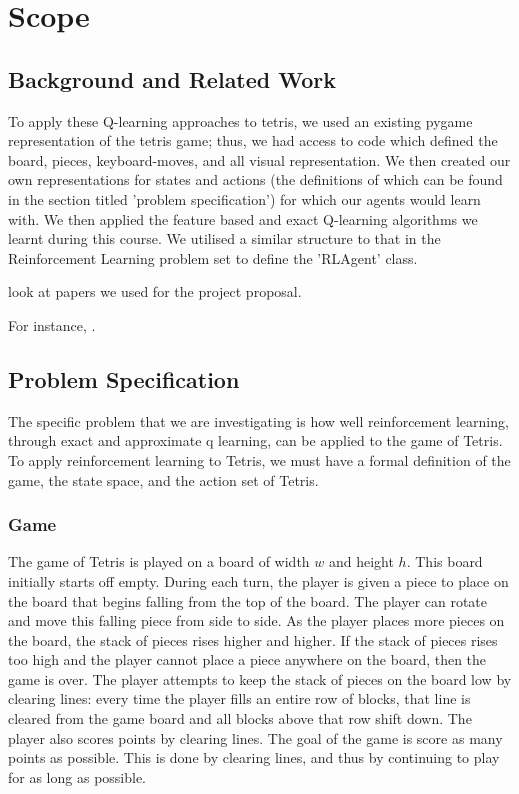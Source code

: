\documentclass[11pt]{article}
\begin{document}
\section{Scope}

\subsection{Background and Related Work}
To apply these Q-learning approaches to tetris, we used an existing pygame representation of the tetris game; thus, we had access to code which defined the board, pieces, keyboard-moves, and all visual representation. We then created our own representations for states and actions (the definitions of which can be found in the section titled 'problem specification') for which our agents would learn with. We then applied the feature based and exact Q-learning algorithms we learnt during this course. We utilised a similar structure to that in the Reinforcement Learning problem set to define the 'RLAgent' class.

look at papers we used for the project proposal.

For instance, \cite{hochreiter1997long}.


\subsection{Problem Specification}
The specific problem that we are investigating is how well reinforcement learning, through exact and approximate q learning, can be applied to the game of Tetris. To apply reinforcement learning to Tetris, we must have a formal definition of the game, the state space, and the action set of Tetris.

\subsubsection{Game}
The game of Tetris is played on a board of width $w$ and height $h$. This board initially starts off empty. During each turn, the player is given a piece to place on the board that begins falling from the top of the board. The player can rotate and move this falling piece from side to side. As the player places more pieces on the board, the stack of pieces rises higher and higher. If the stack of pieces rises too high and the player cannot place a piece anywhere on the board, then the game is over. The player attempts to keep the stack of pieces on the board low by clearing lines: every time the player fills an entire row of blocks, that line is cleared from the game board and all blocks above that row shift down. The player also scores points by clearing lines. The goal of the game is score as many points as possible. This is done by clearing lines, and thus by continuing to play for as long as possible.
\end{document}
